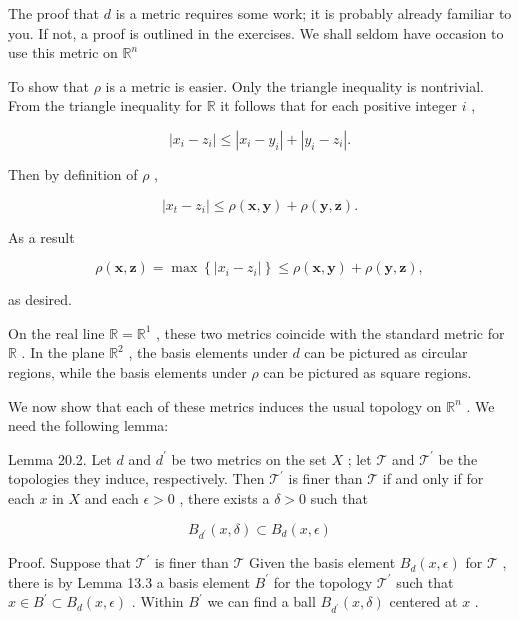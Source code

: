 The proof that \(d\) is a metric requires some work; it is probably already familiar to you. If not, a proof is outlined in the exercises. We shall seldom have occasion to use this metric on \({\mathbb{R}}^{n}\)

To show that \(\rho\) is a metric is easier. Only the triangle inequality is nontrivial. From the triangle inequality for \(\mathbb{R}\) it follows that for each positive integer \(i\) ,

\[
\left| {{x}_{i} - {z}_{i}}\right|  \leq  \left| {{x}_{i} - {y}_{i}}\right|  + \left| {{y}_{i} - {z}_{i}}\right| .
\]

Then by definition of \(\rho\) ,

\[
\left| {{x}_{t} - {z}_{i}}\right|  \leq  \rho \left( {\mathbf{x},\mathbf{y}}\right)  + \rho \left( {\mathbf{y},\mathbf{z}}\right) .
\]

As a result

\[
\rho \left( {\mathbf{x},\mathbf{z}}\right)  = \max \left\{  \left| {{x}_{i} - {z}_{i}}\right| \right\}   \leq  \rho \left( {\mathbf{x},\mathbf{y}}\right)  + \rho \left( {\mathbf{y},\mathbf{z}}\right) ,
\]

as desired.

On the real line \(\mathbb{R} = {\mathbb{R}}^{1}\) , these two metrics coincide with the standard metric for \(\mathbb{R}\) . In the plane \({\mathbb{R}}^{2}\) , the basis elements under \(d\) can be pictured as circular regions, while the basis elements under \(\rho\) can be pictured as square regions.

We now show that each of these metrics induces the usual topology on \({\mathbb{R}}^{n}\) . We need the following lemma:

Lemma 20.2. Let \(d\) and \({d}^{\prime }\) be two metrics on the set \(X\) ; let \(\mathcal{T}\) and \({\mathcal{T}}^{\prime }\) be the topologies they induce, respectively. Then \({\mathcal{T}}^{\prime }\) is finer than \(\mathcal{T}\) if and only if for each \(x\) in \(X\) and each \(\epsilon  > 0\) , there exists a \(\delta  > 0\) such that

\[
{B}_{{d}^{\prime }}\left( {x,\delta }\right)  \subset  {B}_{d}\left( {x,\epsilon }\right)
\]

Proof. Suppose that \({\mathcal{T}}^{\prime }\) is finer than \(\mathcal{T}\) Given the basis element \({B}_{d}\left( {x,\epsilon }\right)\) for \(\mathcal{T}\) , there is by Lemma 13.3 a basis element \({B}^{\prime }\) for the topology \({\mathcal{T}}^{\prime }\) such that \(x \in  {B}^{\prime } \subset  {B}_{d}\left( {x,\epsilon }\right)\) . Within \({B}^{\prime }\) we can find a ball \({B}_{{d}^{\prime }}\left( {x,\delta }\right)\) centered at \(x\) .

